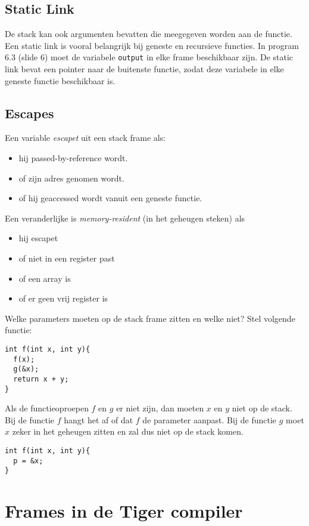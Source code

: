 \subsection{Static Link}

De stack kan ook argumenten bevatten die meegegeven worden aan de functie. Een static link is vooral belangrijk bij geneste en recursieve functies. In program 6.3 (slide 6) moet de variabele \texttt{output} in elke frame beschikbaar zijn. De static link bevat een pointer naar de buitenste functie, zodat deze variabele in elke geneste functie beschikbaar is.



\subsection{Escapes}
Een variable \textit{escapet} uit een stack frame als:
\begin{itemize}
	\item hij passed-by-reference wordt.
	\item of zijn adres genomen wordt.
	\item of hij geaccessed wordt vanuit een geneste functie.
\end{itemize}

Een veranderlijke is \textit{memory-resident} (in het geheugen steken) als
\begin{itemize}
	\item hij escapet
	\item of niet in een register past
	\item of een array is
	\item of er geen vrij register is
\end{itemize}

Welke parameters moeten op de stack frame zitten en welke niet? Stel volgende functie:
\begin{lstlisting}
int f(int x, int y){
  f(x);
  g(&x);
  return x + y;
}
\end{lstlisting}
Als de functieoproepen $f$ en $g$ er niet zijn, dan moeten $x$ en $y$ niet op de stack. Bij de functie $f$ hangt het af of dat $f$ de parameter aanpast. Bij de functie $g$ moet $x$ zeker in het geheugen zitten en zal dus niet op de stack komen.
\begin{lstlisting}
int f(int x, int y){
  p = &x;
}
\end{lstlisting}


\section{Frames in de Tiger compiler}
